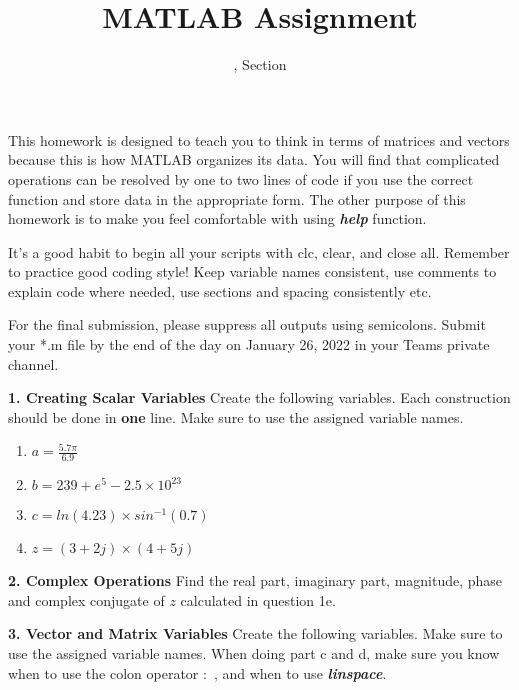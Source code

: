 \documentclass[11pt]{article}
\title{MATLAB Assignment \Homework}
\author{\Session, Section \Section}
\date{}
\def\DateOfSubmission{January 26, 2022 }
\newenvironment{qparts}{\begin{enumerate}[{(}a{)}]}{\end{enumerate}}
\begin{document}
\maketitle

This homework is designed to teach you to think in terms of matrices and vectors because this is how MATLAB organizes its data. You will find that complicated operations can be resolved by one to two lines of code if you use the correct function and store data in the appropriate form. The other purpose of this homework is to make you feel comfortable with using \textbf{\textit{help}} function. 

It's a good habit to begin all your scripts with clc, clear, and close all. Remember to practice good coding style! Keep variable names consistent, use comments to explain code where needed, use sections and spacing consistently etc. 

For the final submission, please suppress all outputs using semicolons. Submit your *.m file by the end of the day on \DateOfSubmission in your Teams private channel. 


\noindent \textbf{1. Creating Scalar Variables} Create the following variables. Each construction should be done in \textbf{one} line. Make sure to use the assigned variable names. 
\begin{qparts}
\item
$ a = \frac{5.7 \pi}{6.9} $
\item 
$ b = 239+e^5 - 2.5 \times 10^{23}$
\item
$ c = ln(4.23) \times sin^{-1}(0.7)$
\item 
$ z = (3+2j) \times (4+5j) $

\end{qparts}

\noindent \textbf{2. Complex Operations} Find the real part, imaginary part, magnitude, phase and complex conjugate of $z$ calculated in question 1e.

\noindent \textbf{3. Vector and Matrix Variables} Create the following variables. Make sure to use the assigned variable names. When doing part c and d, make sure you know when to use the colon operator $:$ , and when to use \textbf{\textit{linspace}}. 
\end{document}
